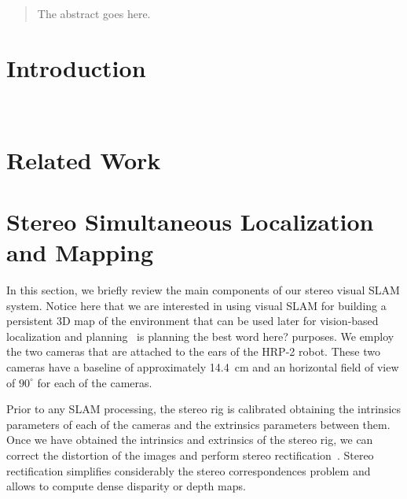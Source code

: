 \documentclass[conference]{IEEEtran}
\newcommand{\PFA}[1]{{\color{red}\fbox{PFA:} #1}}
\begin{document}

\begin{abstract}
The abstract goes here.
\end{abstract}


\IEEEpeerreviewmaketitle

\section{Introduction}~\label{sec:introduction}

\section{Related Work}\label{sec:related}

\section{Stereo Simultaneous Localization and Mapping}\label{sec:vslam}
In this section, we briefly review the main components of our stereo visual SLAM system. Notice here that we are interested in using visual SLAM for building a persistent 3D map of the environment that can be used later for vision-based localization and planning~\PFA{is planning the best word here?} purposes. We employ the two cameras that are attached to the ears of the HRP-2 robot. These two cameras have a baseline of approximately 14.4~cm and an horizontal field of view of $90^{\circ}$ for each of the cameras. 

Prior to any SLAM processing, the stereo rig is calibrated obtaining the intrinsics parameters of each of the cameras and the extrinsics parameters between them. Once we have obtained the intrinsics and extrinsics of the stereo rig, we can correct the distortion of the images and perform stereo rectification~\citep{Hartley99ijcv}. Stereo rectification simplifies considerably the stereo correspondences problem and allows to compute dense disparity or depth maps. 
\end{document}
